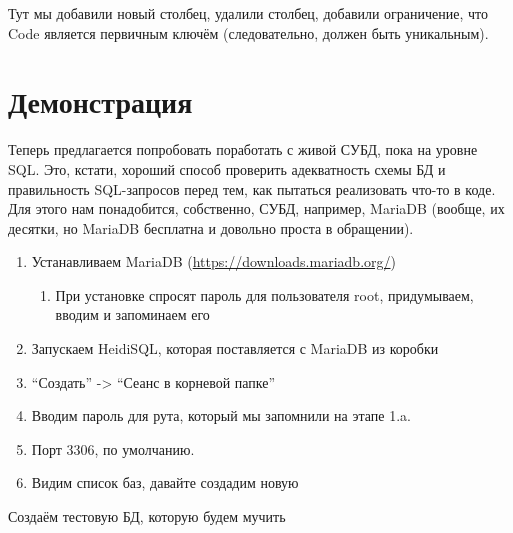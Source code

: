 \documentclass[a5paper]{article}
\begin{document}
Тут мы добавили новый столбец, удалили столбец, добавили ограничение, что Code является первичным ключём (следовательно, должен быть уникальным).

\section{Демонстрация}

Теперь предлагается попробовать поработать с живой СУБД, пока на уровне SQL. Это, кстати, хороший способ проверить адекватность схемы БД и правильность SQL-запросов перед тем, как пытаться реализовать что-то в коде. Для этого нам понадобится, собственно, СУБД, например, MariaDB (вообще, их десятки, но MariaDB бесплатна и довольно проста в обращении).

\begin{enumerate}
    \item Устанавливаем MariaDB (\url{https://downloads.mariadb.org/})
    \begin{enumerate}
        \item При установке спросят пароль для пользователя root, придумываем, вводим и запоминаем его
    \end{enumerate}
    \item Запускаем HeidiSQL, которая поставляется с MariaDB из коробки
    \item ``Создать'' -> ``Сеанс в корневой папке''
    \item Вводим пароль для рута, который мы запомнили на этапе 1.a.
    \item Порт 3306, по умолчанию.
    \item Видим список баз, давайте создадим новую
\end{enumerate}

Создаём тестовую БД, которую будем мучить
\end{document}
